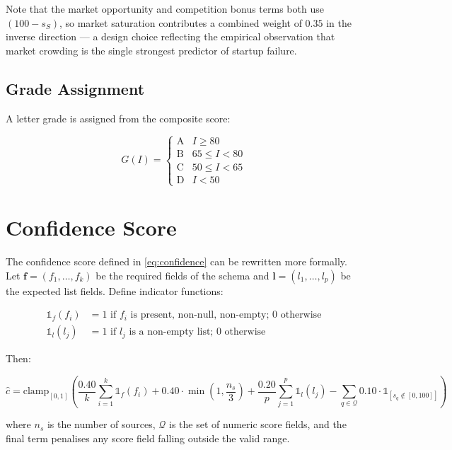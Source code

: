 \documentclass[12pt,a4paper,oneside]{book}
\begin{document}
Note that the market opportunity and competition bonus terms both use $(100 - s_S)$, so market saturation contributes a combined weight of $0.35$ in the inverse direction — a design choice reflecting the empirical observation that market crowding is the single strongest predictor of startup failure.

\subsection{Grade Assignment}

A letter grade is assigned from the composite score:

\begin{equation}
  G(I) =
  \begin{cases}
    \text{A} & I \geq 80 \\
    \text{B} & 65 \leq I < 80 \\
    \text{C} & 50 \leq I < 65 \\
    \text{D} & I < 50
  \end{cases}
\end{equation}

\section{Confidence Score}

The confidence score defined in \cref{eq:confidence} can be rewritten more formally. Let $\mathbf{f} = (f_1, \ldots, f_k)$ be the required fields of the schema and $\mathbf{l} = (l_1, \ldots, l_p)$ be the expected list fields. Define indicator functions:

\begin{align}
  \mathbb{1}_f(f_i) &= 1 \text{ if } f_i \text{ is present, non-null, non-empty; } 0 \text{ otherwise} \\
  \mathbb{1}_l(l_j) &= 1 \text{ if } l_j \text{ is a non-empty list; } 0 \text{ otherwise}
\end{align}

Then:

\begin{equation}
  \hat{c} = \text{clamp}_{[0,1]}\!\left(
    \frac{0.40}{k}\sum_{i=1}^{k}\mathbb{1}_f(f_i)
    + 0.40 \cdot \min\!\left(1, \frac{n_s}{3}\right)
    + \frac{0.20}{p}\sum_{j=1}^{p}\mathbb{1}_l(l_j)
    - \sum_{q \in \mathcal{Q}} 0.10 \cdot \mathbb{1}_{[s_q \notin [0,100]]}
  \right)
\end{equation}

where $n_s$ is the number of sources, $\mathcal{Q}$ is the set of numeric score fields, and the final term penalises any score field falling outside the valid range.
\end{document}
